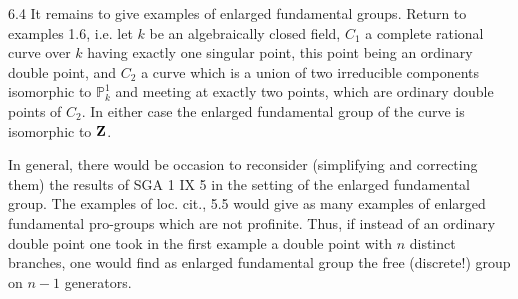 \begin{examples}{6.4}\label{X.6.4}
It remains to give examples of enlarged fundamental groups. Return to examples 1.6, i.e. let $k$ be an algebraically closed field, $C_1$ a complete rational curve over $k$ having exactly one singular point, this point being an ordinary double point, and $C_2$ a curve which is a union of two irreducible components isomorphic to $\mathbb P^1_k$ and meeting at exactly two points, which are ordinary double points of $C_2$. In either case the enlarged fundamental group of the curve is isomorphic to $\mathbf{Z}$.

In general, there would be occasion to reconsider (simplifying and correcting them) the results of SGA 1 IX 5 in the setting of the enlarged fundamental group. The examples of loc. cit., 5.5 would give as many examples of enlarged fundamental pro-groups which are not profinite. Thus, if instead of an ordinary double point one took in the first example a double point with $n$ distinct branches, one would find as enlarged fundamental group the free (discrete!) group on $n-1$ generators.
\end{examples}

